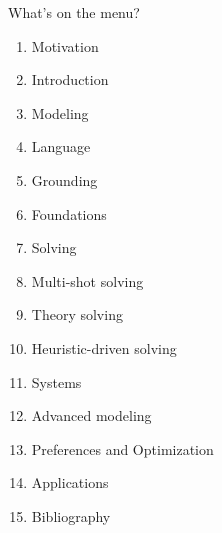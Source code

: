 \begin{frame}{What's on the menu?}
  \begin{enumerate}
  \item Motivation
  \item Introduction
  \item Modeling
  \item Language
  \item Grounding
  \item Foundations
  \item Solving
  \item Multi-shot solving
  \item Theory solving
  \item Heuristic-driven solving
  \item Systems
  \item Advanced modeling
  \item Preferences and Optimization
  \item Applications
  \item [] Bibliography
  \end{enumerate}
\end{frame}
%

